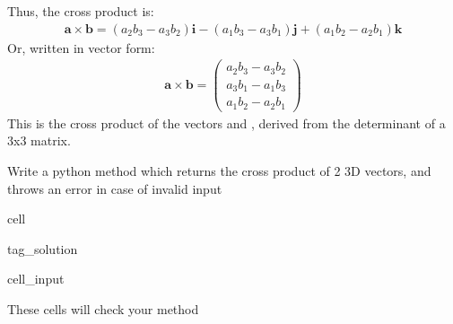 \documentclass[letterpaper,10pt,english]{jupyterBook}
\begin{document}
\sphinxAtStartPar
Thus, the cross product is:
\begin{equation*}
\begin{split}
\mathbf{a} \times \mathbf{b} = \left( a_2 b_3 - a_3 b_2 \right) \mathbf{i} - \left( a_1 b_3 - a_3 b_1 \right) \mathbf{j} + \left( a_1 b_2 - a_2 b_1 \right) \mathbf{k}
\end{split}
\end{equation*}
\sphinxAtStartPar
Or, written in vector form:
\begin{equation*}
\begin{split}
\mathbf{a} \times \mathbf{b} = \begin{pmatrix}
a_2 b_3 - a_3 b_2 \\
a_3 b_1 - a_1 b_3 \\
a_1 b_2 - a_2 b_1
\end{pmatrix}
\end{split}
\end{equation*}
\sphinxAtStartPar
This is the cross product of the vectors  and , derived from the determinant of a 3x3 matrix.

\sphinxAtStartPar
Write a python method which returns the cross product of 2 3D vectors, and throws an error in case of invalid input

\begin{sphinxuseclass}{cell}
\begin{sphinxuseclass}{tag_solution}\begin{sphinxVerbatimInput}

\begin{sphinxuseclass}{cell_input}
\begin{sphinxVerbatim}[commandchars=\\\{\}]
\end{sphinxVerbatim}

\end{sphinxuseclass}\end{sphinxVerbatimInput}

\end{sphinxuseclass}
\end{sphinxuseclass}
\sphinxAtStartPar
These cells will check your method
\end{document}

